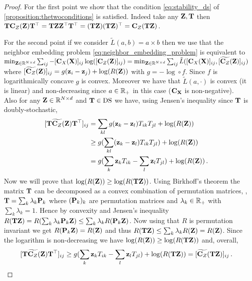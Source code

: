 \begin{proof}
	For the first point we show that the condition \cref{eq:stability_ds} of \cref{proposition:thetwoconditions} is satisfied. Indeed take any ${\mathbf{Z}}, {\mathbf{T}}$ then ${\mathbf{T}} {\mathbf{C}}_{Z}({\mathbf{Z}}) {\mathbf{T}}^\top = {\mathbf{T}} {\mathbf{Z}} {\mathbf{Z}}^\top {\mathbf{T}}^\top = ({\mathbf{T}} {\mathbf{Z}})({\mathbf{T}} {\mathbf{Z}})^\top = {\mathbf{C}}_{Z}({\mathbf{T}} {\mathbf{Z}})$.
	
	For the second point if we consider $\tilde L(a,b) = a\times b$ then we use that the neighbor embedding problem \cref{eq:neighbor_embedding_problem} is equivalent to $\min_{{\mathbf{Z}} \in \mathbb{R}^{N \times d}} \sum_{ij} - [{\mathbf{C}}_{X}({\mathbf{X}})]_{ij}\log([{\mathbf{C}}_{Z}({\mathbf{Z}})]_{ij}) = \min_{{\mathbf{Z}} \in \mathbb{R}^{N \times d}} \sum_{ij} \tilde{L}([{\mathbf{C}}_{X}({\mathbf{X}})]_{ij}, [\widetilde{{\mathbf{C}}_{Z}}({\mathbf{Z}})]_{ij})$ where $[\widetilde{{\mathbf{C}}_{Z}}({\mathbf{Z}})]_{ij} = g({\mathbf{z}}_i-{\mathbf{z}}_j) + \log(R({\mathbf{Z}}))$ with $g = -\log \circ f$. Since $f$ is logarithmically concave $g$ is convex. Moreover we have that $\tilde{L}(a, \cdot)$ is convex (it is linear) and non-decreasing since $a \in \mathbb{R}_+$ in this case (${\mathbf{C}}_{\mathbf{X}}$ is non-negative). Also for any ${\mathbf{Z}} \in \mathbb{R}^{N \times d}$ and ${\mathbf{T}} \in \operatorname{DS}$ we have, using Jensen's inequality since ${\mathbf{T}}$ is doubly-stochastic,
	\begin{equation}
		\begin{split}
			[{\mathbf{T}} \widetilde{{\mathbf{C}}_{Z}}({\mathbf{Z}}) {\mathbf{T}}^\top]_{ij} &= \sum_{kl} g({\mathbf{z}}_k-{\mathbf{z}}_l) T_{ik} T_{jl} + \log(R({\mathbf{Z}})) \\
			&\geq  g(\sum_{kl}({\mathbf{z}}_k-{\mathbf{z}}_l) T_{ik} T_{jl}) + \log(R({\mathbf{Z}}))\\
			&= g(\sum_{k} {\mathbf{z}}_k T_{ik} - \sum_{l} {\mathbf{z}}_l T_{jl})+ \log(R({\mathbf{Z}}))\,.
		\end{split}
	\end{equation}
	Now we will prove that $\log(R({\mathbf{Z}})) \geq \log(R({\mathbf{T}} {\mathbf{Z}}))$. Using Birkhoff's theorem \citep{birkhoff1946tres} the matrix ${\mathbf{T}}$ can be decomposed as a convex combination of permutation matrices, \ie,  ${\mathbf{T}} = \sum_k \lambda_k {\mathbf{P}}_k$ where $({\mathbf{P}}_k)_k$ are permutation matrices and $\lambda_k \in \mathbb{R}_{+}$ with $\sum_{k} \lambda_k = 1$. Hence by convexity and Jensen's inequality $R({\mathbf{T}} {\mathbf{Z}}) = R(\sum_k \lambda_k {\mathbf{P}}_k {\mathbf{Z}}) \leq \sum_{k} \lambda_k R({\mathbf{P}}_k {\mathbf{Z}})$. Now using that $R$ is permutation invariant we get $R({\mathbf{P}}_k {\mathbf{Z}}) = R({\mathbf{Z}})$ and thus $R({\mathbf{T}} {\mathbf{Z}}) \leq \sum_k \lambda_k R({\mathbf{Z}}) = R({\mathbf{Z}})$. Since the logarithm is non-decreasing we have $\log(R({\mathbf{Z}})) \geq \log(R({\mathbf{T}} {\mathbf{Z}}))$ and, overall,
	\begin{equation}
		\begin{split}
			[\mT \widetilde{\simi}(\mZ) \mT^\top]_{ij} \geq  g(\sum_{k} \vz_k T_{ik} - \sum_{l} \vz_l T_{jl}) + \log(R(\mT \mZ)) = [\widetilde{\simi}(\mT\mZ)]_{ij}\,.

\end{split}
\end{equation}
\end{proof}
